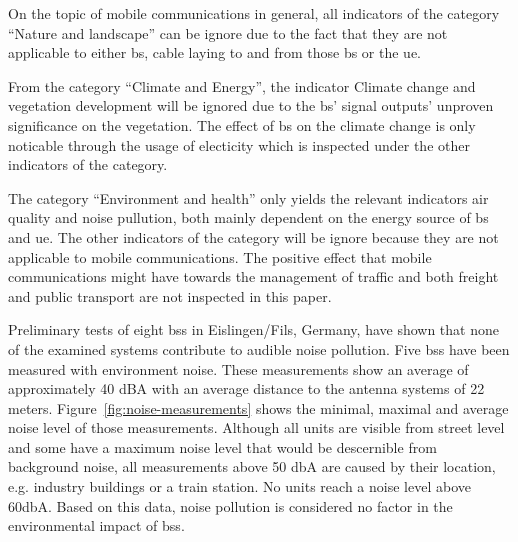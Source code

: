 \documentclass[11pt,a4paper]{article}
\begin{document}
On the topic of mobile communications in general, all indicators of the category \enquote{Nature and landscape} can be ignore due to the fact that they are not applicable to either \acrshort{bs}, cable laying to and from those \acrshort{bs} or the \acrshort{ue}.

From the category \enquote{Climate and Energy}, the indicator Climate change and vegetation development will be ignored due to the \acrshort{bs}' signal outputs' unproven significance on the vegetation.
The effect of \acrshort{bs} on the climate change is only noticable through the usage of electicity which is inspected under the other indicators of the category.

The category \enquote{Environment and health} only yields the relevant indicators air quality and noise pullution, both mainly dependent on the energy source of \acrshort{bs} and \acrshort{ue}.
The other indicators of the category will be ignore because they are not applicable to mobile communications.
The positive effect that mobile communications might have towards the management of traffic and both freight and public transport are not inspected in this paper.

Preliminary tests of eight \acrlong{bs}s in Eislingen/Fils, Germany, have shown that none of the examined systems contribute to audible noise pollution.
Five \acrshort{bs}s have been measured with environment noise.
These measurements show an average of approximately 40 dBA with an average distance to the antenna systems of 22 meters.
Figure~\ref{fig:noise-measurements} shows the minimal, maximal and average noise level of those measurements.
Although all units are visible from street level and some have a maximum noise level that would be descernible from background noise, all measurements above 50 dbA are caused by their location, e.g. industry buildings or a train station.
No units reach a noise level above 60dbA.
Based on this data, noise pollution is considered no factor in the environmental impact of \acrlong{bs}s.

\noiseData
\end{document}
